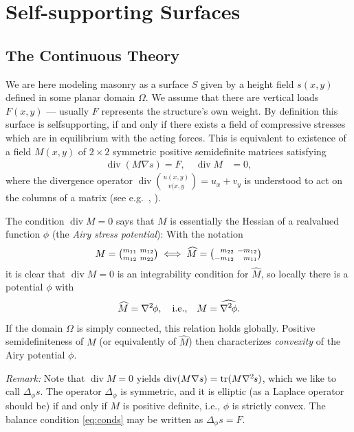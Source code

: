 \documentclass[annual]{acmsiggraph}
\def\wh{\widehat}
\def\Div{\mathop{\textrm{div}}\nolimits}
\def\tr{\mathop{\textrm{tr}}\nolimits}
\def\ess{s}
\def\Hess#1{{\def\testess{#1}\nabla^2\ifx\testess\ess\!s\else #1\fi}}
\def\Hess#1{\text{$\nabla^2\hskip-.2ex #1$}}
\begin{document}

\section{Self-supporting Surfaces}

\subsection{The Continuous Theory}

We are here modeling masonry as a surface $S$ given by a height field
$s(x,y)$ defined in some planar domain $\Omega$. We assume that there are
vertical loads $F(x,y)$ --- usually $F$ represents the structure's own
weight. By definition this surface is self\dash supporting, if and only if
there exists a field of compressive stresses which are in equilibrium with
the acting forces. This is equivalent to existence of a field $M(x,y)$ of
$2\times 2$ symmetric positive semidefinite matrices satisfying
	\begin{align}
	\Div (M\nabla s) = F, \quad
	\Div M &= 0,
	  \label{eq:conds}
	\end{align}
 where the divergence operator $\Div{u(x,y)\choose v(x,y}= u_x + v_y$ is
understood to act on the columns of a matrix (see e.g.\
\cite{Fraternali2010}, \cite{Giaquinta1985}). 

The condition $\Div M=0$ says that $M$ is essentially the Hessian of a
real\dash valued function $\phi$ (the {\em Airy stress potential}): With
the notation
	$$
	M =
	{\textstyle {m_{11} \ m_{12} \choose m_{12} \ m_{22}}}
	\iff	
	\wh M =
	{\textstyle {\hphantom{-}m_{22} \ -m_{12} \choose -m_{12}
		 \ \hphantom{-}m_{11}}}
	$$
 it is clear that $\Div M=0$ is an integrability condition for $\wh M$, so
locally there is a potential $\phi$ with
	$$
	\wh M = \Hess\phi, \quad \text{i.e.,}\quad
	M = \wh{\Hess\phi}.
	$$
 If the domain $\Omega$ is simply connected, this relation holds globally.
Positive semidefiniteness of $M$ (or equivalently of $\wh M$) then
characterizes {\em convexity} of the Airy potential $\phi$.

{\it Remark:} Note that $\Div M =0$ yields $\Div(M\nabla s) = \tr(M\Hess
s)$, which we like to call $\Delta_\phi s$. The operator $\Delta_\phi$ is
symmetric, and it is elliptic (as a Laplace operator should be) if and
only if $M$ is positive definite, i.e., $\phi$ is strictly convex. The
balance condition \eqref{eq:conds} may be written as
	$
	\Delta_\phi s = F.
	$
\end{document}

